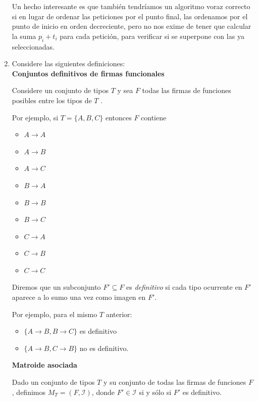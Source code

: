\documentclass[letterpaper, 12pt]{article}
\begin{document}
\begin{enumerate}
Un hecho interesante es que también tendríamos un algoritmo voraz correcto si en lugar de ordenar las peticiones por el punto final, las ordenamos por el punto de inicio en orden decreciente, pero no nos exime de tener que calcular la suma $p_i + t_i$ para cada petición, para verificar si se superpone con las ya seleccionadas. \\



\item Considere las siguientes definiciones: \\

\textbf{Conjuntos definitivos de firmas funcionales}

Considere un conjunto de tipos $T$ y sea $F$ todas las firmas de funciones posibles entre los tipos de $T$ .

Por ejemplo, si $T = \{A, B, C\}$ entonces $F$ contiene

\begin{multicols}{3}
\begin{itemize}
    \item $A \rightarrow A$
    \item $A \rightarrow B$
    \item $A \rightarrow C$
    \item $B \rightarrow A$
    \item $B \rightarrow B$
    \item $B \rightarrow C$
    \item $C \rightarrow A$
    \item $C \rightarrow B$
    \item $C \rightarrow C$
\end{itemize}
\end{multicols}

Diremos que un subconjunto $F' \subseteq F$ es \emph{definitivo} si cada tipo ocurrente en $F'$ aparece a lo sumo una vez como imagen en $F'$.

Por ejemplo, para el mismo $T$ anterior:

\begin{itemize}
    \item $\{A \rightarrow B, B \rightarrow C\}$ es definitivo
    \item $\{A \rightarrow B, C \rightarrow B\}$ no es definitivo.
\end{itemize}

\textbf{Matroide asociada}

Dado un conjunto de tipos $T$ y su conjunto de todas las firmas de funciones $F$, definimos \linebreak $M_T = (F, \mathcal{I})$, donde $F' \in \mathcal{I}$ si y sólo si $F'$ es definitivo. \\


\end{enumerate}
\end{document}
